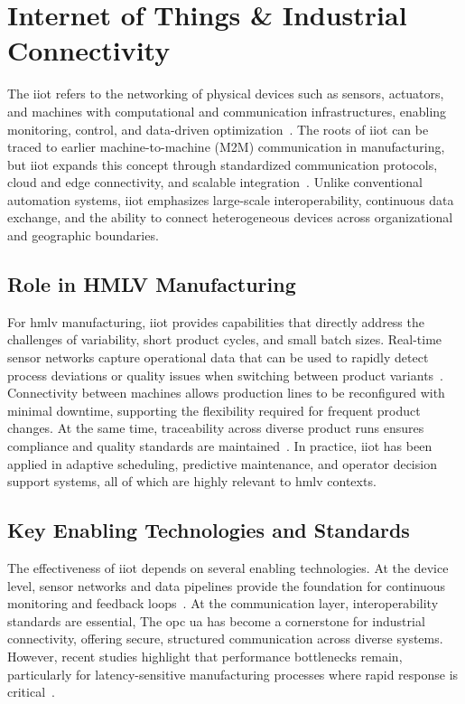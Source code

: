 \section{Internet of Things \& Industrial Connectivity}\label{IOT}

The \ac{iiot} refers to the networking of physical devices such as sensors, actuators, and machines with computational and communication infrastructures, enabling monitoring, control, and data-driven optimization~\cite{boyes-the-industrial-internet-of-things, LEE-2015-a-cps-for-indsutry40-based-manufacturing-systems}.
The roots of \ac{iiot} can be traced to earlier machine-to-machine (M2M) communication in manufacturing, but \ac{iiot} expands this concept through standardized communication protocols, cloud and edge connectivity, and scalable integration~\cite{lu-indsutry-40-a-survey-on-technologies}.
Unlike conventional automation systems, \ac{iiot} emphasizes large-scale interoperability, continuous data exchange, and the ability to connect heterogeneous devices across organizational and geographic boundaries.

\subsection{Role in HMLV Manufacturing}

For \ac{hmlv} manufacturing, \ac{iiot} provides capabilities that directly address the challenges of variability, short product cycles, and small batch sizes.
Real-time sensor networks capture operational data that can be used to rapidly detect process deviations or quality issues when switching between product variants~\cite{al-fuqaha-internet-of-things-a-survey-on-enabling}.
Connectivity between machines allows production lines to be reconfigured with minimal downtime, supporting the flexibility required for frequent product changes.
At the same time, traceability across diverse product runs ensures compliance and quality standards are maintained~\cite{zhong-intelligent-manufacturing-in-the-context}.
In practice, \ac{iiot} has been applied in adaptive scheduling, predictive maintenance, and operator decision support systems, all of which are highly relevant to \ac{hmlv} contexts.

\subsection{Key Enabling Technologies and Standards}

The effectiveness of \ac{iiot} depends on several enabling technologies.
At the device level, sensor networks and data pipelines provide the foundation for continuous monitoring and feedback loops~\cite{lu-indsutry-40-a-survey-on-technologies}.
At the communication layer, interoperability standards are essential, The \ac{opc ua} has become a cornerstone for industrial connectivity, offering secure, structured communication across diverse systems.
However, recent studies highlight that performance bottlenecks remain, particularly for latency-sensitive manufacturing processes where rapid response is critical~\cite{ladegourdie-performance-analysis-of-upc-ua}.

